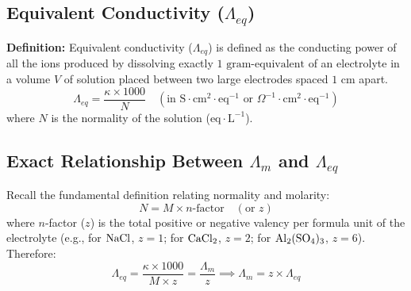 \subsection{Equivalent Conductivity ($\Lambda_{eq}$)}
\textbf{Definition:} Equivalent conductivity ($\Lambda_{eq}$) is defined as the conducting power of all the ions produced by dissolving exactly $1\text{ gram-equivalent}$ of an electrolyte in a volume $V$ of solution placed between two large electrodes spaced $1\text{ cm}$ apart.
\begin{equation}
    \boxed{\Lambda_{eq} = \frac{\kappa \times 1000}{N}} \quad \left(\text{in }\text{S}\cdot\text{cm}^2\cdot\text{eq}^{-1} \text{ or } \Omega^{-1}\cdot\text{cm}^2\cdot\text{eq}^{-1}\right)
\end{equation}
where $N$ is the normality of the solution ($\text{eq}\cdot\text{L}^{-1}$).

\subsection{Exact Relationship Between $\Lambda_m$ and $\Lambda_{eq}$}
Recall the fundamental definition relating normality and molarity:
\begin{equation}
    N = M \times n\text{-factor} \quad (\text{or } z)
\end{equation}
where $n$-factor ($z$) is the total positive or negative valency per formula unit of the electrolyte (e.g., for $\ce{NaCl}$, $z = 1$; for $\ce{CaCl2}$, $z = 2$; for $\ce{Al2(SO4)3}$, $z = 6$). Therefore:
\begin{equation}
    \Lambda_{eq} = \frac{\kappa \times 1000}{M \times z} = \frac{\Lambda_m}{z} \implies \boxed{\Lambda_m = z \times \Lambda_{eq}}
\end{equation}

